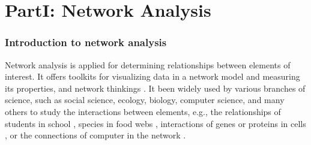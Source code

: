 \section*{PartI: Network Analysis}
\label{ch:partone}

\subsubsection{Introduction to network analysis}
Network analysis is applied for determining relationships between elements of interest. It offers toolkits for visualizing data in a network model and measuring its properties, and network thinkings . It been widely used by various branches of science, such as social science, ecology, biology, computer science, and many others to study the interactions between elements, e.g., the relationships of students in school , species in food webs , interactions of genes or proteins in cells , or the connections of computer in the network .

